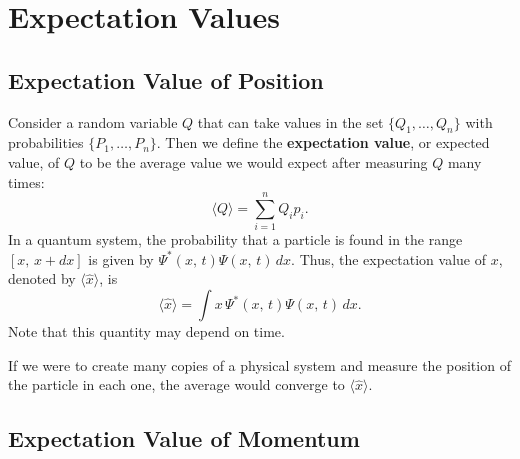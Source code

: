 \section{Expectation Values}

\subsection{Expectation Value of Position}\label{expected_position}

Consider a random variable $Q$ that can take values in the set $\{Q_1,\ldots,Q_n\}$ with probabilities $\{P_1,\ldots,P_n\}$. Then we define the \textbf{expectation value}, or expected value, of $Q$ to be the average value we would expect after measuring $Q$ many times: $$\langle Q\rangle=\sum_{i=1}^nQ_ip_i.$$In a quantum system, the probability that a particle is found in the range$[x,\,x+dx]$ is given by $\Psi^*(x,\,t)\Psi(x,\,t)\,dx$. Thus, the expectation value of $x$, denoted by $\langle\hat{x}\rangle$, is $$\langle\hat{x}\rangle=\int x\,\Psi^*(x,\,t)\Psi(x,\,t)\,dx.$$Note that this quantity may depend on time.

\begin{framedrmk*}
    If we were to create many copies of a physical system and measure the position of the particle in each one, the average would converge to $\langle\hat{x}\rangle$.
\end{framedrmk*}

\subsection{Expectation Value of Momentum}\label{expected_momentum}

